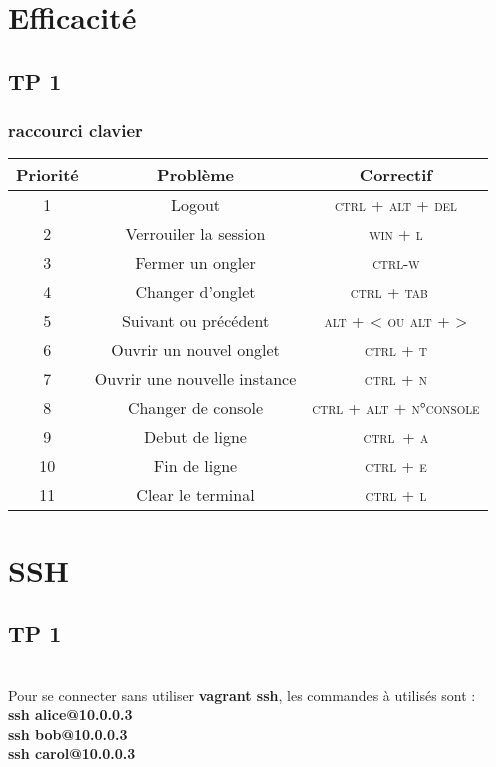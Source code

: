\documentclass{report}
\begin{document}
\chapter{Efficacité}
\section{TP 1}
 
\subsection{raccourci clavier}
\begin{tabular}{|c|c|c|}
	\hline
	\textbf{Priorité} &  \textbf{Problème} & \textbf{Correctif} \\ 
	\hline
	1 & Logout & \textsc{ctrl + alt + del} \\
	\hline
	2 & Verrouiler la session & \textsc{win + l} \\
	\hline  
	3 & Fermer un ongler & \textsc{ctrl-w} \\
	\hline
	4 & Changer d'onglet & \textsc{ctrl + tab}  \\
	\hline
	5 & Suivant ou précédent & \textsc{alt + < ou alt + >} \\
	\hline 
	6 & Ouvrir un nouvel onglet & \textsc{ctrl + t} \\
	\hline
	7 & Ouvrir une nouvelle instance & \textsc{ctrl + n} \\
	\hline 
	8 & Changer de console & \textsc{ctrl + alt + n°console} \\
	\hline 
	9 & Debut de ligne & \textsc{ctrl + a} \\
	\hline 
	10 & Fin de ligne & \textsc{ctrl + e} \\
	\hline 
	11 & Clear le terminal & \textsc{ctrl + l} \\
	\hline 
\end{tabular}


\chapter{SSH}

\section{TP 1}
\\
Pour se connecter sans utiliser \textbf{vagrant ssh}, les commandes à utilisés sont : \\
\textbf{ssh alice@10.0.0.3} \\
\textbf{ssh bob@10.0.0.3} \\
\textbf{ssh carol@10.0.0.3} \\
\end{document}
